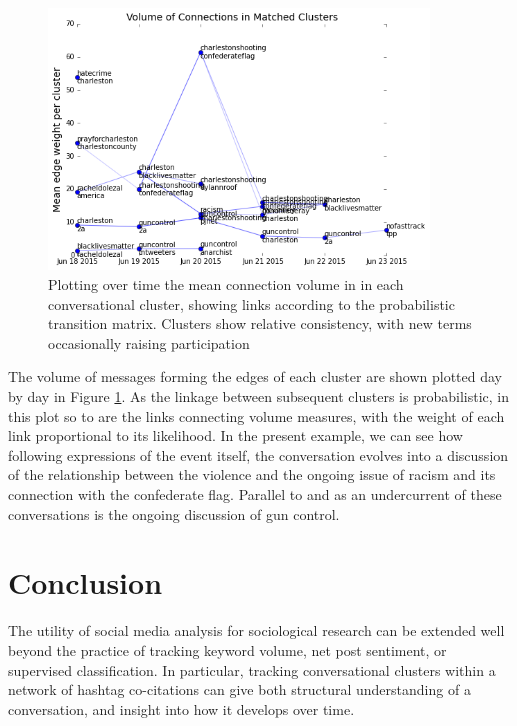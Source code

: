 \documentclass[12pt]{article}
\begin{document}
\begin{figure}[!ht]
  \centering
    \includegraphics[width=0.9\textwidth]{F8_Matched_cluster_timeseries.png}
    \caption{Plotting over time the mean connection volume in in each conversational cluster,  showing links according to the probabilistic transition matrix. Clusters show relative consistency, with new terms occasionally raising participation}
  \label{fig:cluster_volume_graphs}
\end{figure}

The volume of messages forming the edges of each cluster are shown plotted day by day in Figure \ref{fig:cluster_volume_graphs}. As the linkage between subsequent clusters is probabilistic, in this plot so to are the links connecting volume measures, with the weight of each link proportional to its likelihood. In the present example, we can see how following expressions of the event itself, the conversation evolves into a discussion of the relationship between the violence and the ongoing issue of racism and its connection with the confederate flag. Parallel to and as an undercurrent of these conversations is the ongoing discussion of gun control.

\section{Conclusion}
The utility of social media analysis for sociological research can be extended well beyond the practice of tracking keyword volume, net post sentiment, or supervised classification. In particular, tracking conversational clusters within a network of hashtag co-citations can give both structural understanding of a conversation, and insight into how it develops over time.
\end{document}
